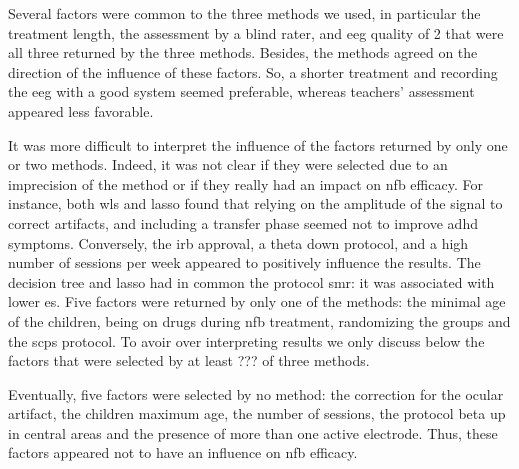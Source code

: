 Several factors were common to the three methods we used, in particular the treatment length, the assessment 
by a blind rater, and \gls{eeg} quality of 2 that were all three returned by the three methods. Besides, 
the methods agreed on the direction of the influence of these factors. So, a shorter treatment and recording the \gls{eeg} 
with a good system seemed preferable, whereas teachers' assessment appeared less favorable.

It was more difficult to interpret the influence of the factors returned by only one or two methods. Indeed, it was not clear if they were
selected due to an imprecision of the method or if they really had an impact on \gls{nfb} efficacy.
For instance, both \gls{wls} and \gls{lasso} found that relying on the amplitude of the signal to correct artifacts, and including a 
transfer phase seemed not to improve \gls{adhd} symptoms. Conversely, the \gls{irb} approval, a theta down protocol, and a high number 
of sessions per week appeared to positively influence the results. The decision tree and \gls{lasso} had in common the protocol \gls{smr}:
it was associated with lower \gls{es}. Five factors were returned by only one of the methods: the minimal age of the children, being on drugs 
during \gls{nfb} treatment, randomizing the groups and the \glspl{scp} protocol. To avoir over interpreting results we
only discuss below the factors that were selected by at least ??? of three methods. 

Eventually, five factors were selected by no method: the correction for the ocular artifact, the children maximum age, the number of sessions,
the protocol beta up in central areas and the presence of more than one active electrode. Thus, these factors appeared not to have an influence on
\gls{nfb} efficacy.   

